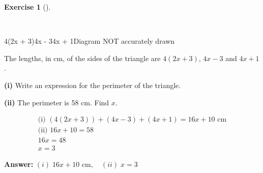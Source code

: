 \documentclass[
  letterpaper,
  DIV=11,
  numbers=noendperiod]{scrreprt}
\theoremstyle{definition}
\newtheorem{exercise}{Exercise}[chapter]
\theoremstyle{remark}
\begin{document}
\begin{exercise}[]\protect\hypertarget{exr-u5-18-2}{}\label{exr-u5-18-2}

~

4(2x + 3)4x - 34x + 1Diagram NOT accurately drawn

The lengths, in cm, of the sides of the triangle are \(4(2x + 3)\),
\(4x - 3\) and \(4x + 1\).

\textbf{(i)} Write an expression for the perimeter of the triangle.

\textbf{(ii)} The perimeter is 58 cm. Find \(x\).

\begin{tcolorbox}[enhanced jigsaw, opacitybacktitle=0.6, coltitle=black, arc=.35mm, colframe=quarto-callout-tip-color-frame, colback=white, bottomrule=.15mm, left=2mm, colbacktitle=quarto-callout-tip-color!10!white, titlerule=0mm, opacityback=0, title=\textcolor{quarto-callout-tip-color}{\faLightbulb}\hspace{0.5em}{🔍 View Solution}, leftrule=.75mm, breakable, rightrule=.15mm, bottomtitle=1mm, toptitle=1mm, toprule=.15mm]

\begin{align*}
\text{(i) } (4(2x + 3)) + (4x - 3) + (4x + 1) = 16x + 10 \text{ cm} \\ \text{(ii) } 16x + 10 = 58 \\ 16x = 48 \\ x = 3
\end{align*}

\textbf{Answer:} \((i)\; 16x + 10 \text{ cm},\quad (ii)\; x = 3\)

\end{tcolorbox}

\end{exercise}
\end{document}
